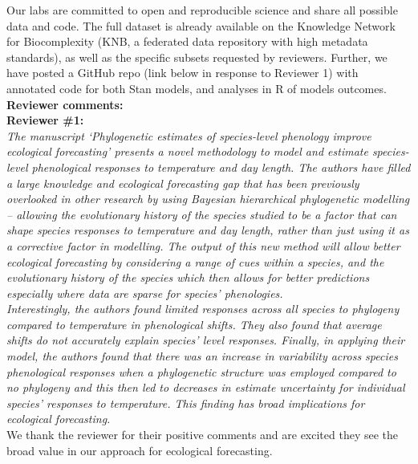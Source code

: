\documentclass[11pt]{article}
\begin{document}
Our labs are committed to open and reproducible science and share all possible data and code. The full dataset is already available on the Knowledge Network for Biocomplexity (KNB, a federated data repository with high metadata standards), as well as the specific subsets requested by reviewers. Further, we have posted a GitHub repo (link below in response to Reviewer 1) with annotated code for both Stan models, and analyses in R of models outcomes.\\ %

{\bf Reviewer comments:} \\

{\bf Reviewer \#1:}\\


\emph{The manuscript ‘Phylogenetic estimates of species-level phenology improve ecological forecasting’ presents a novel methodology to model and estimate species-level phenological responses to temperature and day length. The authors have filled a large knowledge and ecological forecasting gap that has been previously overlooked in other research by using Bayesian hierarchical phylogenetic modelling – allowing the evolutionary history of the species studied to be a factor that can shape species responses to temperature and day length, rather than just using it as a corrective factor in modelling. The output of this new method will allow better ecological forecasting by considering a range of cues within a species, and the evolutionary history of the species which then allows for better predictions especially where data are sparse for species’ phenologies.}\\

\emph{Interestingly, the authors found limited responses across all species to phylogeny compared to temperature in phenological shifts. They also found that average shifts do not accurately explain species’ level responses. Finally, in applying their model, the authors found that there was an increase in variability across species phenological responses when a phylogenetic structure was employed compared to no phylogeny and this then led to decreases in estimate uncertainty for individual species' responses to temperature. This finding has broad implications for ecological forecasting.}\\

We thank the reviewer for their positive comments and are excited they see the broad value in our approach for ecological forecasting.\\
\end{document}
